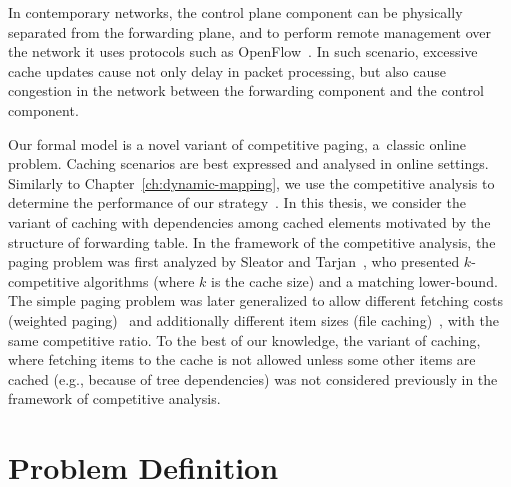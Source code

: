 In contemporary networks, the control plane component can be physically separated from the forwarding plane, and to perform remote management over the network it uses protocols such as OpenFlow~\cite{openflow}.
In such scenario, excessive cache updates cause not only delay in packet processing, but also cause congestion in the network between the forwarding component and the control component.

Our formal model is a novel variant of competitive paging, a~classic online
problem.
Caching scenarios are best expressed and analysed in online settings.
Similarly to Chapter~\ref{ch:dynamic-mapping}, we use the competitive analysis to determine the performance of our strategy~\cite{borodin-book}.
In this thesis, we consider the variant of caching with dependencies among cached elements motivated by the structure of forwarding table.
In the framework of the competitive analysis, the paging problem was
first analyzed  by Sleator and Tarjan~\cite{competitive-analysis}, who presented $k$-competitive algorithms (where $k$ is the cache size) and a matching lower-bound.
The simple paging problem was later generalized to allow different fetching
costs (weighted paging)~\cite{double-coverage,young-paging-greedy-dual} and
additionally different item sizes (file caching)~\cite{young-paging-landlord},
with the same competitive ratio.
To the best of our knowledge, the variant of caching, where fetching items to
the cache is not allowed unless some other items are cached (e.g., because of 
tree dependencies) was 
not considered previously in the framework of competitive analysis.




\section{Problem Definition}\label{sec:preliminaries}

